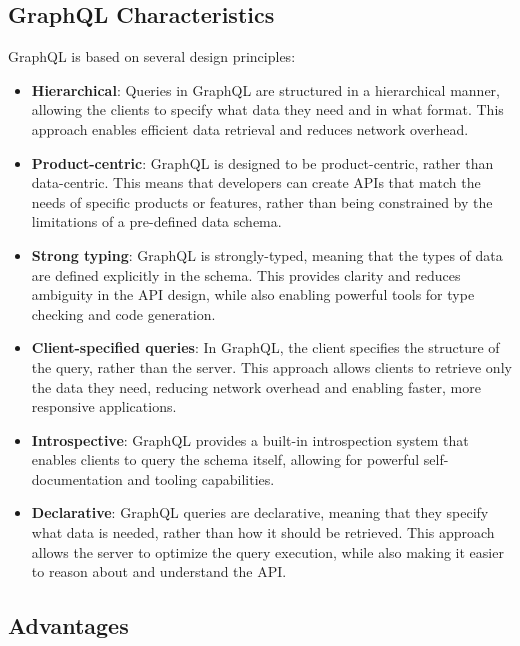 \subsection{GraphQL Characteristics}\label{subsection:background:graphql:graphql-characteristics}

GraphQL is based on several design principles: \cite{misc:-:background:graphql:graphql-specification}

\begin{itemize}
    \item \textbf{Hierarchical}: Queries in GraphQL are structured in a hierarchical manner, allowing the clients to specify what data they need and in what format. This approach enables efficient data retrieval and reduces network overhead.

    \item \textbf{Product-centric}: GraphQL is designed to be product-centric, rather than data-centric. This means that developers can create APIs that match the needs of specific products or features, rather than being constrained by the limitations of a pre-defined data schema.

    \item \textbf{Strong typing}: GraphQL is strongly-typed, meaning that the types of data are defined explicitly in the schema. This provides clarity and reduces ambiguity in the API design, while also enabling powerful tools for type checking and code generation.

    \item \textbf{Client-specified queries}: In GraphQL, the client specifies the structure of the query, rather than the server. This approach allows clients to retrieve only the data they need, reducing network overhead and enabling faster, more responsive applications.

    \item \textbf{Introspective}: GraphQL provides a built-in introspection system that enables clients to query the schema itself, allowing for powerful self-documentation and tooling capabilities.

    \item \textbf{Declarative}: GraphQL queries are declarative, meaning that they specify what data is needed, rather than how it should be retrieved. This approach allows the server to optimize the query execution, while also making it easier to reason about and understand the API.
\end{itemize}

\subsection{Advantages}\label{subsection:background:graphql:graphql-advantages}

